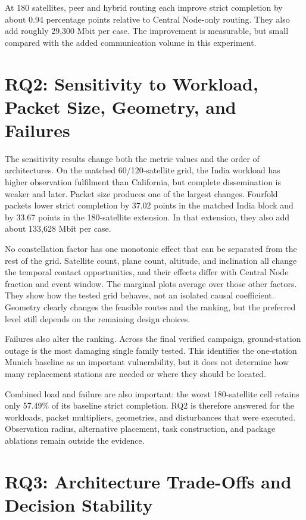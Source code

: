 At 180 satellites, peer and hybrid routing each improve strict completion by about 0.94 percentage points relative to Central Node-only routing. They also add roughly 29,300 Mbit per case. The improvement is measurable, but small compared with the added communication volume in this experiment.

\section{RQ2: Sensitivity to Workload, Packet Size, Geometry, and Failures}

The sensitivity results change both the metric values and the order of architectures. On the matched 60/120-satellite grid, the India workload has higher observation fulfilment than California, but complete dissemination is weaker and later. Packet size produces one of the largest changes. Fourfold packets lower strict completion by 37.02 points in the matched India block and by 33.67 points in the 180-satellite extension. In that extension, they also add about 133,628 Mbit per case.

No constellation factor has one monotonic effect that can be separated from the rest of the grid. Satellite count, plane count, altitude, and inclination all change the temporal contact opportunities, and their effects differ with Central Node fraction and event window. The marginal plots average over those other factors. They show how the tested grid behaves, not an isolated causal coefficient. Geometry clearly changes the feasible routes and the ranking, but the preferred level still depends on the remaining design choices.

Failures also alter the ranking. Across the final verified campaign, ground-station outage is the most damaging single family tested. This identifies the one-station Munich baseline as an important vulnerability, but it does not determine how many replacement stations are needed or where they should be located.

Combined load and failure are also important: the worst 180-satellite cell retains only 57.49\% of its baseline strict completion. RQ2 is therefore answered for the workloads, packet multipliers, geometries, and disturbances that were executed. Observation radius, alternative placement, task construction, and package ablations remain outside the evidence.

\section{RQ3: Architecture Trade-Offs and Decision Stability}

